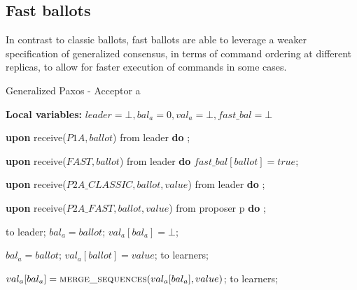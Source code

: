 \subsection{Fast ballots} 

In contrast to classic ballots, fast ballots are able to leverage a weaker specification of generalized consensus, in terms of command ordering at different replicas, to allow for faster execution of commands in some cases.

\begin{algorithm} 
	\caption{Generalized Paxos - Acceptor a}
	\textbf{Local variables:} $leader = \bot, bal_a = 0,val_a = \bot,fast\_bal = \bot$
	\begin{algorithmic}[1]
		\State \textbf{upon} receive($P1A, ballot$) from leader \textbf{do}
		\State \hspace{\algorithmicindent} ;
		
		\State
		\State \textbf{upon} receive($FAST,ballot$) from leader \textbf{do}
		\State \hspace{\algorithmicindent} $fast\_bal[ballot] = true$;
		
		\State
		\State \textbf{upon} receive($P2A\_CLASSIC, ballot, value$) from leader \textbf{do}
		\State \hspace{\algorithmicindent} ; 
		
		\State		
		\State \textbf{upon} receive($P2A\_FAST,ballot,value$) from proposer p \textbf{do}
		\State \hspace{\algorithmicindent} ;
		
		\State
		\State {} to leader;
		\State $bal_a = ballot$;	
		\State $val_a[bal_a] = \bot$;	
		\EndIf
		\EndFunction
		
		\State
		\State $bal_a = ballot$;
		\State $val_a[ballot] = value$;
		\State {} to learners;
		
		\EndIf
		\EndFunction
		
		\State
		\State $val_a[bal_a] =  \Call{merge\_sequences}{val_a[bal_a], value}$;
		\State {} to learners;
		\EndIf
		\EndFunction
	\end{algorithmic}
\end{algorithm}
